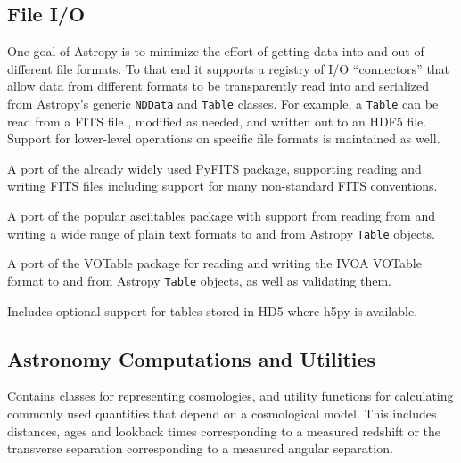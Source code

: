 \documentclass[11pt,twoside]{article}
\begin{document}
\subsection{File I/O}

One goal of Astropy is to minimize the effort of getting data into and out of
different file formats.  To that end it supports a registry of I/O ``connectors''
that allow data from different formats to be transparently read into and
serialized from Astropy's generic \texttt{NDData} and \texttt{Table} classes.
For example, a \texttt{Table} can be read from a FITS file \citep{fits3},
modified as needed, and written out to an HDF5 file.  Support for lower-level
operations on specific file formats is maintained as well.


A port of the already widely used PyFITS \citep{barrett1999pyfits} package,
supporting reading and writing FITS files including support for many
non-standard FITS conventions.


A port of the popular asciitables package with support from reading from and
writing a wide range of plain text formats to and from Astropy \texttt{Table}
objects.


A port of the VOTable package for reading and writing the IVOA VOTable format
\citep{oschenbein2009votable} to and from Astropy \texttt{Table} objects, as
well as validating them.


Includes optional support for tables stored in HD5 where h5py is available.

\subsection{Astronomy Computations and Utilities}


Contains classes for representing cosmologies, and utility functions for
calculating commonly used quantities that depend on a cosmological model.  This
includes distances, ages and lookback times corresponding to a measured
redshift or the transverse separation corresponding to a measured angular
separation.

\end{document}

